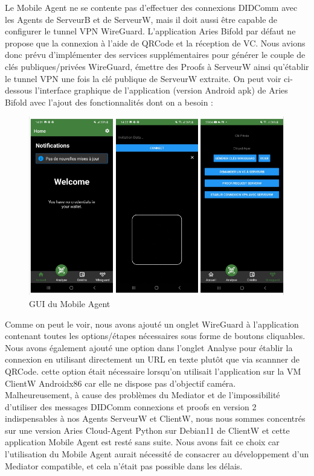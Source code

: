 \documentclass[12pt, openany]{report}
\begin{document}
\begin{flushleft}
\vspace{2mm}
Le Mobile Agent ne se contente pas d'effectuer des connexions DIDComm avec les Agents de ServeurB et de ServeurW, mais il doit aussi être capable de configurer le tunnel VPN WireGuard. L'application Aries Bifold par défaut ne propose que la connexion à l'aide de QRCode et la réception de VC. Nous avions donc prévu d'implémenter des services supplémentaires pour générer le couple de clés publiques/privées WireGuard, émettre des Proofs à ServeurW ainsi qu'établir le tunnel VPN une fois la clé publique de ServeurW extraite. On peut voir ci-dessous l'interface graphique de l'application (version Android apk) de Aries Bifold avec l'ajout des fonctionnalités dont on a besoin :\\
\begin{figure}[H]
\includegraphics[width=\textwidth]{mobile-agent.png}
\centering
\caption{GUI du Mobile Agent}
\end{figure}
Comme on peut le voir, nous avons ajouté un onglet WireGuard à l'application contenant toutes les options/étapes nécessaires sous forme de boutons cliquables. Nous avons également ajouté une option dans l'onglet Analyse pour établir la connexion en utilisant directement un URL en texte plutôt que via scannner de QRCode. cette option était nécessaire lorsqu'on utilisait l'application sur la VM ClientW Androidx86 car elle ne dispose pas d'objectif caméra.\\
\vspace{2mm}
Malheureusement, à cause des problèmes du Mediator et de l'impossibilité d'utiliser des messages DIDComm connexions et proofs en version 2 indispensables à nos Agents ServeurW et ClientW, nous nous sommes concentrés sur une version Aries Cloud-Agent Python sur Debian11 de ClientW et cette application Mobile Agent est resté sans suite. Nous avons fait ce choix car l'utilisation du Mobile Agent aurait nécessité de consacrer au développement d'un Mediator compatible, et cela n'était pas possible dans les délais.
\end{flushleft}
\end{document}

